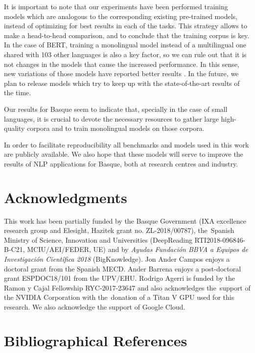 \documentclass[10pt, a4paper]{article}
\begin{document}
It is important to note that our experiments have been performed training models which are analogous to the corresponding existing pre-trained models, instead of optimizing for best results in each of the tasks. This strategy allows to make a head-to-head comparison, and to conclude that the training corpus is key. In the case of BERT, training a monolingual model instead of a multilingual one shared with 103 other languages is also a key factor, so we can rule out that it is not changes in the models that cause the increased performance. In this sense, new variations of those models have reported better results \cite{liu2019roberta}. In the future, we plan to release models which try to keep up with the state-of-the-art results of the time.

Our results for Basque seem to indicate that, specially in the case of small languages, it is crucial to devote the necessary resources to gather large high-quality corpora and to train monolingual models on those corpora.

In order to facilitate reproducibility all benchmarks and models used in this work are publicly available. We also hope that these models will serve to improve the results of NLP applications for Basque, both at research centres and industry.




\section{Acknowledgments}

This work has been partially funded by the Basque Government (IXA excellence research group and Elesight, Hazitek grant no. ZL-2018/00787), the~Spanish Ministry of Science, Innovation and Universities (DeepReading RTI2018-096846-B-C21, MCIU/AEI/FEDER, UE) and by \textit{Ayudas Fundación BBVA a Equipos de Investigación Científica 2018} (BigKnowledge).  Jon Ander Campos enjoys a doctoral grant from the Spanish MECD. Ander Barrena enjoys a post-doctoral grant ESPDOC18/101 from the UPV/EHU. Rodrigo Agerri is funded by the Ramon y Cajal Fellowship RYC-2017-23647 and also acknowledges the~support of the NVIDIA Corporation with the~donation of a Titan V GPU used for this research. We also acknowledge the support of Google Cloud.

\section{Bibliographical References}



\end{document}
